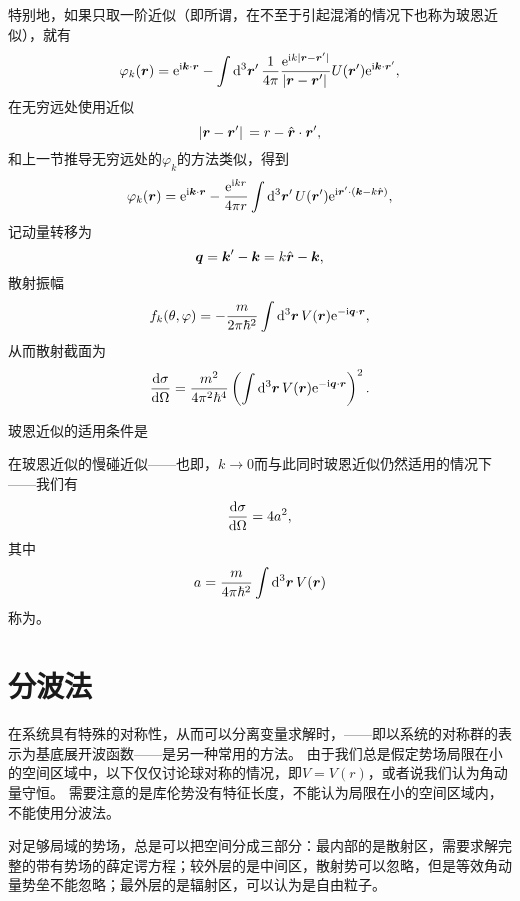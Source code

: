 特别地，如果只取一阶近似（即所谓，在不至于引起混淆的情况下也称为玻恩近似），就有
\begin{equation}
    \varphi_k(\vb*{r}) = \mathrm{e}^{\mathrm{i} \vb*{k} \cdot \vb*{r}} - \int \dd[3]{\vb*{r}'} \frac{1}{4\pi} \frac{\mathrm{e}^{\mathrm{i} k \abs*{\vb*{r} - \vb*{r}'}}}{\abs*{\vb*{r} - \vb*{r}'}} U(\vb*{r}') \mathrm{e}^{\mathrm{i} \vb*{k} \cdot \vb*{r}'},
\end{equation}
在无穷远处使用近似
\[
    \abs*{\vb*{r}-\vb*{r}'} = r - \hat{\vb*{r}} \cdot \vb*{r}',
\]
和上一节推导无穷远处的$\varphi_k$的方法类似，得到
\[
    \varphi_k(\vb*{r}) = \mathrm{e}^{\mathrm{i} \vb*{k} \cdot \vb*{r}} - \frac{\mathrm{e}^{\mathrm{i} k r}}{4 \pi r} \int \dd[3]{\vb*{r}'} U(\vb*{r}') \mathrm{e}^{\mathrm{i} \vb*{r}' \cdot (\vb*{k} - k \hat{\vb*{r}})},
\]
记动量转移为
\begin{equation}
    \vb*{q} = \vb*{k}' - \vb*{k} = k \hat{\vb*{r}} - \vb*{k},
\end{equation}
散射振幅
\begin{equation}
    f_k(\theta, \varphi) = - \frac{m}{2\pi \hbar^2} \int \dd[3]{\vb*{r}} V(\vb*{r}) \mathrm{e}^{- \mathrm{i} \vb*{q} \cdot \vb*{r}}, 
\end{equation}
从而散射截面为
\begin{equation}
    \dv{\sigma}{\Omega} = \frac{m^2}{4\pi^2 \hbar^4} \left( \int \dd[3]{\vb*{r}} V(\vb*{r}) \mathrm{e}^{- \mathrm{i} \vb*{q} \cdot \vb*{r}} \right)^2.
\end{equation}

玻恩近似的适用条件是

在玻恩近似的慢碰近似——也即，$k \to 0$而与此同时玻恩近似仍然适用的情况下——我们有
\begin{equation}
    \dv{\sigma}{\Omega} = 4 a^2,
\end{equation}
其中
\begin{equation}
    a = \frac{m}{4\pi \hbar^2} \int \dd[3]{\vb*{r}} V(\vb*{r})
\end{equation}
称为。

\section{分波法}

在系统具有特殊的对称性，从而可以分离变量求解时，——即以系统的对称群的表示为基底展开波函数——是另一种常用的方法。
由于我们总是假定势场局限在小的空间区域中，以下仅仅讨论球对称的情况，即$V = V(r)$，或者说我们认为角动量守恒。
需要注意的是库伦势没有特征长度，不能认为局限在小的空间区域内，不能使用分波法。

对足够局域的势场，总是可以把空间分成三部分：最内部的是散射区，需要求解完整的带有势场的薛定谔方程；较外层的是中间区，散射势可以忽略，但是等效角动量势垒不能忽略；最外层的是辐射区，可以认为是自由粒子。

